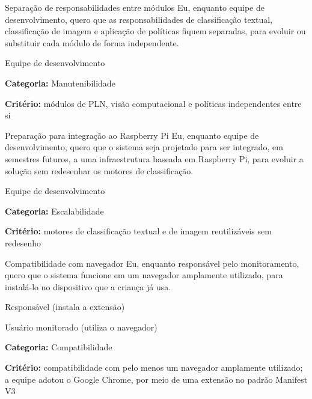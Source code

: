 \documentclass[
    12pt,           %
    oneside,        %
    a4paper,        %
    chapter=TITLE,  %
    english,        %
    brazil          %
]{abntex2}
\begin{document}
{Separação de responsabilidades entre módulos}
{Eu, enquanto equipe de desenvolvimento, quero que as responsabilidades de classificação textual, classificação de imagem e aplicação de políticas fiquem separadas, para evoluir ou substituir cada módulo de forma independente.}
{\begin{dadoslista}
\item Equipe de desenvolvimento
\end{dadoslista}}
{\begin{dadoslista}
\item \textbf{Categoria:} Manutenibilidade
\item \textbf{Critério:} módulos de PLN, visão computacional e políticas independentes entre si
\end{dadoslista}}

{Preparação para integração ao Raspberry Pi}
{Eu, enquanto equipe de desenvolvimento, quero que o sistema seja projetado para ser integrado, em semestres futuros, a uma infraestrutura baseada em Raspberry Pi, para evoluir a solução sem redesenhar os motores de classificação.}
{\begin{dadoslista}
\item Equipe de desenvolvimento
\end{dadoslista}}
{\begin{dadoslista}
\item \textbf{Categoria:} Escalabilidade
\item \textbf{Critério:} motores de classificação textual e de imagem reutilizáveis sem redesenho
\end{dadoslista}}

{Compatibilidade com navegador}
{Eu, enquanto responsável pelo monitoramento, quero que o sistema funcione em um navegador amplamente utilizado, para instalá-lo no dispositivo que a criança já usa.}
{\begin{dadoslista}
\item Responsável (instala a extensão)
\item Usuário monitorado (utiliza o navegador)
\end{dadoslista}}
{\begin{dadoslista}
\item \textbf{Categoria:} Compatibilidade
\item \textbf{Critério:} compatibilidade com pelo menos um navegador amplamente utilizado; a equipe adotou o Google Chrome, por meio de uma extensão no padrão Manifest V3
\end{dadoslista}}
\end{document}
